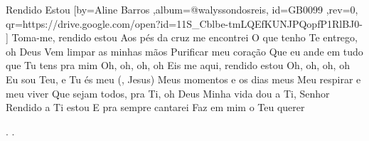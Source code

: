 \beginsong
{Rendido Estou %
}[by={Aline Barros %
},album={@walyssondosreis},
id={GB0099 %
},rev={0}, %
qr={https://drive.google.com/open?id=11S_Cblbe-tmLQEfKUNJPQopfP1RlBJ0- %
}]
\beginverse*
Toma-me, rendido estou
Aos pés da cruz me encontrei
O que tenho Te entrego, oh Deus
\endverse
\beginverse*
Vem limpar as minhas mãos
Purificar meu coração
Que eu ande em tudo que Tu tens pra mim
\endverse
\beginverse*
Oh, oh, oh, oh
Eis me aqui, rendido estou
Oh, oh, oh, oh
Eu sou Teu, e Tu és meu (, Jesus)
\endverse
\beginverse*
Meus momentos e os dias meus
Meu respirar e meu viver
Que sejam todos, pra Ti, oh Deus
\endverse
\beginchorus
Minha vida dou a Ti, Senhor
Rendido a Ti estou
E pra sempre cantarei
Faz em mim o Teu querer
\endchorus

\beginverse*\color{white}
.
.
\endverse
\begin{comment}
\lstset{basicstyle=\scriptsize\bf} %
\tab{Solo 1}
\begin{lstlisting}
E|-----------------------------------------------------|
B|-----------------------------------------------------|
G|-----------------------------------------------------|
D|-----------------------------------------------------|
A|-----------------------------------------------------|
E|-----------------------------------------------------|
\end{lstlisting}
\end{comment}
 
